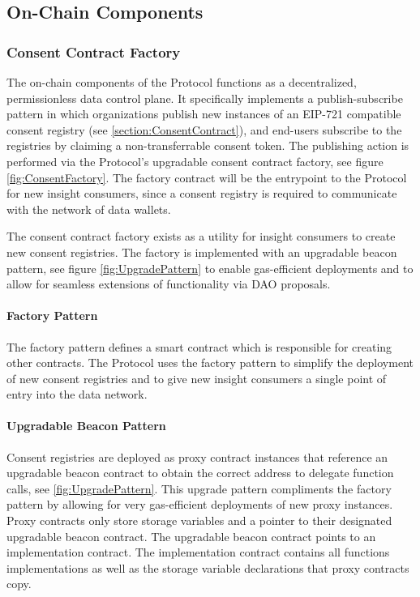 \subsection{On-Chain Components}
\label{section:OnChain}

\subsubsection{Consent Contract Factory}
\label{section:ConsentFactory}


The on-chain components of the Protocol functions as a decentralized, permissionless data control plane. It specifically implements a publish-subscribe pattern
in which organizations publish new instances of an EIP-721 compatible consent registry (see \ref{section:ConsentContract}), and end-users 
subscribe to the registries by claiming a non-transferrable consent token. The publishing action is performed via the Protocol's upgradable 
consent contract factory, see figure \ref{fig:ConsentFactory}. The factory contract will be the entrypoint to the Protocol for new insight 
consumers, since a consent registry is required to communicate with the network of data wallets. 


The consent contract factory exists as a utility for insight consumers to create new consent registries. The factory is implemented with an 
upgradable beacon pattern, see figure \ref{fig:UpgradePattern} to enable gas-efficient deployments and to allow for seamless extensions of functionality
via DAO proposals. 

\paragraph{Factory Pattern}
The factory pattern defines a smart contract which is responsible for creating other contracts. The Protocol uses the factory 
pattern to simplify the deployment of new consent registries and to give new insight consumers a single point of entry into the data network. 

\paragraph{Upgradable Beacon Pattern}
\label{section:BeaconPattern}

Consent registries are deployed as proxy contract instances that reference an upgradable beacon contract to obtain the correct address to delegate
function calls, see \ref{fig:UpgradePattern}. This upgrade pattern compliments the factory pattern by allowing for very gas-efficient deployments 
of new proxy instances. Proxy contracts only store storage variables and a pointer to their designated upgradable beacon contract. The upgradable 
beacon contract points to an implementation contract. The implementation contract contains all functions implementations as well as the storage
variable declarations that proxy contracts copy. 

